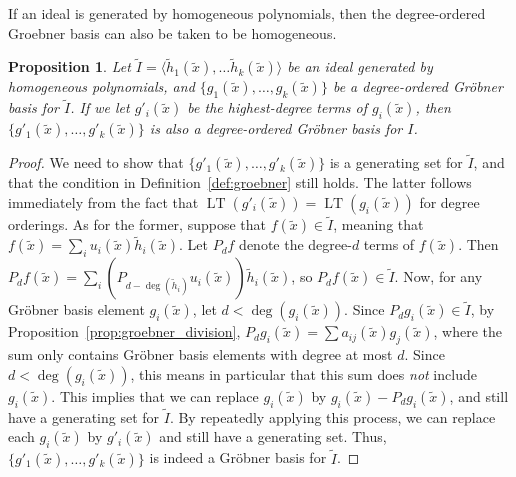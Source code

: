 \documentclass[aps,pra,notitlepage,preprintnumbers,11pt,tightenlines]{revtex4-1}
\DeclareMathOperator{\LT}{LT}
\newtheorem{proposition}[theorem]{Proposition}
\begin{document}
If an ideal is generated by homogeneous polynomials, then the
degree-ordered Groebner basis can also be taken to be homogeneous.
\begin{proposition}
  Let $\tilde{I} = \langle \tilde{h}_1(\tilde{x}), \dots \tilde{h}_k(\tilde{x}) \rangle$ be an ideal
  generated by homogeneous polynomials, and $\{g_1(\tilde{x}), \dots, g_k(\tilde{x})\}$ be a
  degree-ordered Gr\"{o}bner basis for $\tilde{I}$. If we let $g'_i(\tilde{x})$ be the
  highest-degree terms of $g_i(\tilde{x})$, then $\{g'_1(\tilde{x}),
  \dots, g'_k(\tilde{x})\}$ is also a degree-ordered Gr\"{o}bner basis for
  $I$.
  \label{prop:groebner_homo}
\end{proposition}
\begin{proof}
  We need to show that $\{g'_1(\tilde{x}), \dots, g'_k(\tilde{x})\}$ is a
  generating set for $\tilde{I}$, and that the condition in
  Definition~\ref{def:groebner} still holds. The latter follows
  immediately from the fact that $\LT(g'_i(\tilde{x})) = \LT(g_i(\tilde{x}))$ for degree
  orderings. As for the former, suppose
  that $f(\tilde{x}) \in \tilde{I}$, meaning that $f(\tilde{x}) = \sum_{i}
  u_i(\tilde{x}) \tilde{h}_i(\tilde{x})$. Let $P_df$ denote the degree-$d$ terms of
  $f(\tilde{x})$. Then
  $P_d f(\tilde{x}) = \sum_i (P_{d - \deg(\tilde{h}_i)}u_i(\tilde{x}) ) \tilde{h}_i(\tilde{x})$, so
  $P_d f (\tilde{x}) \in \tilde{I}$. Now, for any Gr\"{o}bner basis element $g_i(\tilde{x})$,
  let $d < \deg(g_i(\tilde{x}))$. Since $P_d g_i(\tilde{x}) \in \tilde{I}$, by
  Proposition~\ref{prop:groebner_division}, $P_d g_i(\tilde{x}) = \sum a_{ij}(\tilde{x})
  g_j(\tilde{x})$, where the sum only contains Gr\"{o}bner basis elements with
  degree at most $d$. Since $d < \deg(g_i(\tilde{x}))$, this means in particular
  that this sum does \emph{not} include $g_i(\tilde{x})$. This implies that we
  can replace $g_i(\tilde{x})$ by $g_i(\tilde{x})
  - P_d g_i(\tilde{x})$, and still have a generating set for $\tilde{I}$. By repeatedly
  applying this process, we can replace each $g_i(\tilde{x})$ by $g'_i(\tilde{x})$ and still
  have a generating set. Thus, $\{g'_1(\tilde{x}), \dots, g'_k(\tilde{x})\}$ is indeed a
  Gr\"{o}bner basis for $\tilde{I}$.
\end{proof}
\end{document}

